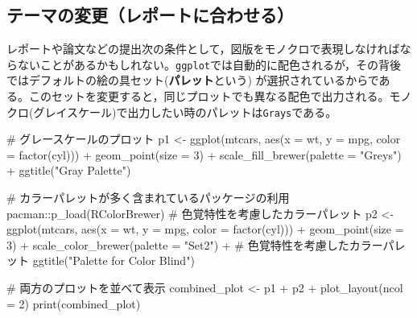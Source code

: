 \documentclass[
  a4paper,
]{ltjsbook}
\newenvironment{Shaded}{\begin{snugshade}}{\end{snugshade}}
\newcommand{\AttributeTok}[1]{\textcolor[rgb]{0.40,0.45,0.13}{#1}}
\newcommand{\CommentTok}[1]{\textcolor[rgb]{0.37,0.37,0.37}{#1}}
\newcommand{\DecValTok}[1]{\textcolor[rgb]{0.68,0.00,0.00}{#1}}
\newcommand{\FunctionTok}[1]{\textcolor[rgb]{0.28,0.35,0.67}{#1}}
\newcommand{\NormalTok}[1]{\textcolor[rgb]{0.00,0.23,0.31}{#1}}
\newcommand{\OtherTok}[1]{\textcolor[rgb]{0.00,0.23,0.31}{#1}}
\newcommand{\SpecialCharTok}[1]{\textcolor[rgb]{0.37,0.37,0.37}{#1}}
\newcommand{\StringTok}[1]{\textcolor[rgb]{0.13,0.47,0.30}{#1}}
\begin{document}
\subsection{テーマの変更（レポートに合わせる）}\label{ux30c6ux30fcux30deux306eux5909ux66f4ux30ecux30ddux30fcux30c8ux306bux5408ux308fux305bux308b}

レポートや論文などの提出次の条件として，図版をモノクロで表現しなければならないことがあるかもしれない。\texttt{ggplot}では自動的に配色されるが，その背後ではデフォルトの絵の具セット(\textbf{パレット}という)
が選択されているからである。このセットを変更すると，同じプロットでも異なる配色で出力される。モノクロ(グレイスケール)で出力したい時のパレットは\texttt{Grays}である。

\begin{Shaded}
\begin{Highlighting}[]
\CommentTok{\# グレースケールのプロット}
\NormalTok{p1 }\OtherTok{\textless{}{-}} \FunctionTok{ggplot}\NormalTok{(mtcars, }\FunctionTok{aes}\NormalTok{(}\AttributeTok{x =}\NormalTok{ wt, }\AttributeTok{y =}\NormalTok{ mpg, }\AttributeTok{color =} \FunctionTok{factor}\NormalTok{(cyl))) }\SpecialCharTok{+}
  \FunctionTok{geom\_point}\NormalTok{(}\AttributeTok{size =} \DecValTok{3}\NormalTok{) }\SpecialCharTok{+}
  \FunctionTok{scale\_fill\_brewer}\NormalTok{(}\AttributeTok{palette =} \StringTok{"Greys"}\NormalTok{) }\SpecialCharTok{+}
  \FunctionTok{ggtitle}\NormalTok{(}\StringTok{"Gray Palette"}\NormalTok{)}

\CommentTok{\# カラーパレットが多く含まれているパッケージの利用}
\NormalTok{pacman}\SpecialCharTok{::}\FunctionTok{p\_load}\NormalTok{(RColorBrewer)}
\CommentTok{\# 色覚特性を考慮したカラーパレット}
\NormalTok{p2 }\OtherTok{\textless{}{-}} \FunctionTok{ggplot}\NormalTok{(mtcars, }\FunctionTok{aes}\NormalTok{(}\AttributeTok{x =}\NormalTok{ wt, }\AttributeTok{y =}\NormalTok{ mpg, }\AttributeTok{color =} \FunctionTok{factor}\NormalTok{(cyl))) }\SpecialCharTok{+}
  \FunctionTok{geom\_point}\NormalTok{(}\AttributeTok{size =} \DecValTok{3}\NormalTok{) }\SpecialCharTok{+}
  \FunctionTok{scale\_color\_brewer}\NormalTok{(}\AttributeTok{palette =} \StringTok{"Set2"}\NormalTok{) }\SpecialCharTok{+} \CommentTok{\# 色覚特性を考慮したカラーパレット}
  \FunctionTok{ggtitle}\NormalTok{(}\StringTok{"Palette for Color Blind"}\NormalTok{)}

\CommentTok{\# 両方のプロットを並べて表示}
\NormalTok{combined\_plot }\OtherTok{\textless{}{-}}\NormalTok{ p1 }\SpecialCharTok{+}\NormalTok{ p2 }\SpecialCharTok{+} \FunctionTok{plot\_layout}\NormalTok{(}\AttributeTok{ncol =} \DecValTok{2}\NormalTok{)}
\FunctionTok{print}\NormalTok{(combined\_plot)}
\end{Highlighting}
\end{Shaded}
\end{document}

